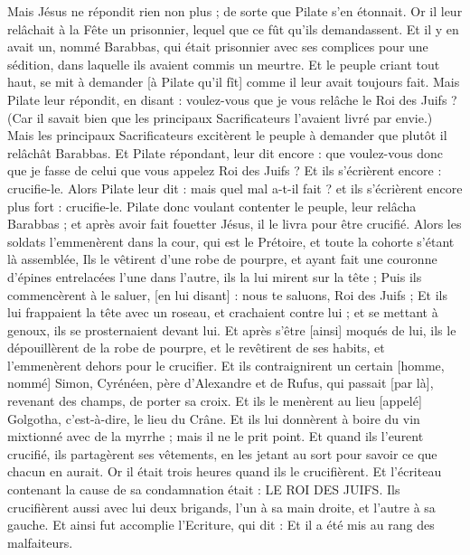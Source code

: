 \begin{multicols}{2}
Mais Jésus ne répondit rien non plus ; de sorte que Pilate s'en étonnait.
Or il leur relâchait à la Fête un prisonnier, lequel que ce fût qu'ils demandassent.
Et il y en avait un, nommé Barabbas, qui était prisonnier avec ses complices pour une sédition, dans laquelle ils avaient commis un meurtre.
Et le peuple criant tout haut, se mit à demander [à Pilate qu'il fît] comme il leur avait toujours fait.
Mais Pilate leur répondit, en disant : voulez-vous que je vous relâche le Roi des Juifs ?
(Car il savait bien que les principaux Sacrificateurs l'avaient livré par envie.)
Mais les principaux Sacrificateurs excitèrent le peuple à demander que plutôt il relâchât Barabbas.
Et Pilate répondant, leur dit encore : que voulez-vous donc que je fasse de celui que vous appelez Roi des Juifs ?
Et ils s'écrièrent encore : crucifie-le.
Alors Pilate leur dit : mais quel mal a-t-il fait ? et ils s'écrièrent encore plus fort : crucifie-le.
Pilate donc voulant contenter le peuple, leur relâcha Barabbas ; et après avoir fait fouetter Jésus, il le livra pour être crucifié.
Alors les soldats l'emmenèrent dans la cour, qui est le Prétoire, et toute la cohorte s'étant là assemblée,
Ils le vêtirent d'une robe de pourpre, et ayant fait une couronne d'épines entrelacées l'une dans l'autre, ils la lui mirent sur la tête ;
Puis ils commencèrent à le saluer, [en lui disant] : nous te saluons, Roi des Juifs ;
Et ils lui frappaient la tête avec un roseau, et crachaient contre lui ; et se mettant à genoux, ils se prosternaient devant lui.
Et après s'être [ainsi] moqués de lui, ils le dépouillèrent de la robe de pourpre, et le revêtirent de ses habits, et l'emmenèrent dehors pour le crucifier.
Et ils contraignirent un certain [homme, nommé] Simon, Cyrénéen, père d'Alexandre et de Rufus, qui passait [par là], revenant des champs, de porter sa croix.
Et ils le menèrent au lieu [appelé] Golgotha, c'est-à-dire, le lieu du Crâne.
Et ils lui donnèrent à boire du vin mixtionné avec de la myrrhe ; mais il ne le prit point.
Et quand ils l'eurent crucifié, ils partagèrent ses vêtements, en les jetant au sort pour savoir ce que chacun en aurait.
Or il était trois heures quand ils le crucifièrent.
Et l'écriteau contenant la cause de sa condamnation était : LE ROI DES JUIFS.
Ils crucifièrent aussi avec lui deux brigands, l'un à sa main droite, et l'autre à sa gauche.
Et ainsi fut accomplie l'Ecriture, qui dit : Et il a été mis au rang des malfaiteurs.

\end{multicols}
